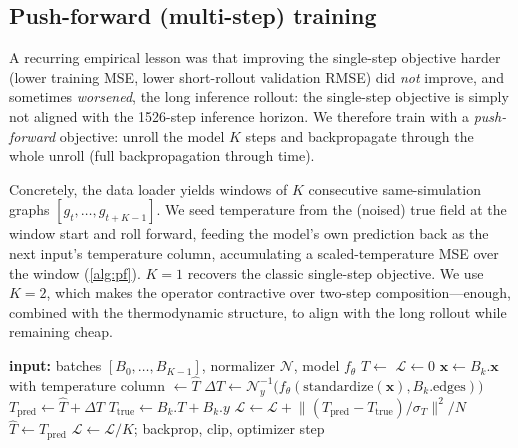 \documentclass[11pt]{article}
\newcommand{\Tinf}{T_{\infty}}
\theoremstyle{definition}
\begin{document}
\subsection{Push-forward (multi-step) training}
\label{sec:pushforward}

A recurring empirical lesson was that improving the single-step objective harder (lower
training MSE, lower short-rollout validation RMSE) did \emph{not} improve, and sometimes
\emph{worsened}, the long inference rollout: the single-step objective is simply not
aligned with the \num{1526}-step inference horizon. We therefore train with a
\emph{push-forward} objective: unroll the model $K$ steps and backpropagate through the
whole unroll (full backpropagation through time).

Concretely, the data loader yields windows of $K$ consecutive same-simulation graphs
$[g_t,\dots,g_{t+K-1}]$. We seed temperature from the (noised) true field at the window
start and roll forward, feeding the model's own prediction back as the next input's
temperature column, accumulating a scaled-temperature MSE over the window
(\cref{alg:pf}). $K=1$ recovers the classic single-step objective. We use $K=2$, which
makes the operator contractive over two-step composition---enough, combined with the
thermodynamic structure, to align with the long rollout while remaining cheap.

\begin{algorithm}[t]
\caption{Push-forward training step (window of $K$ step-aligned batches)}
\label{alg:pf}
\begin{algorithmic}[1]
\State \textbf{input:} batches $[B_0,\dots,B_{K-1}]$, normalizer $\mathcal N$, model $f_\theta$
\State $\hat T \gets$ \Call{DynamicNoise}{$B_0.T,\,B_0.\Tinf$} 
\State $\mathcal L \gets 0$
  \State $\bm x \gets B_k.\bm x$ with temperature column $\gets \hat T$
  \State $\Delta T \gets \mathcal N_y^{-1}\big(f_\theta(\text{standardize}(\bm x), B_k.\text{edges})\big)$
  \State $T_{\mathrm{pred}} \gets \hat T + \Delta T$
  \State $T_{\mathrm{true}} \gets B_k.T + B_k.y$
  \State $\mathcal L \gets \mathcal L + \big\lVert (T_{\mathrm{pred}}-T_{\mathrm{true}})/\sigma_T\big\rVert^2 / N$
  \State $\hat T \gets T_{\mathrm{pred}}$ 
\EndFor
\State $\mathcal L \gets \mathcal L / K$; \quad backprop, clip, optimizer step
\end{algorithmic}
\end{algorithm}
\end{document}
